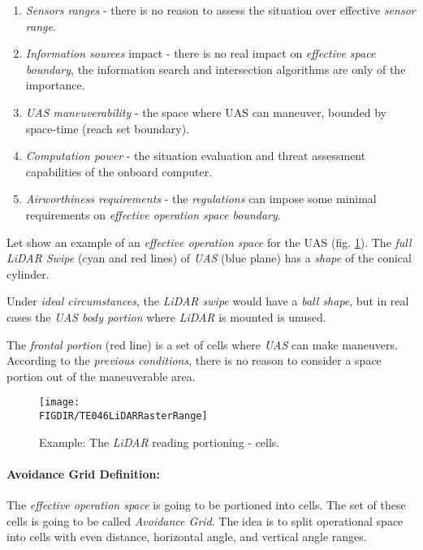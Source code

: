 \begin{enumerate}
        \item \emph{Sensors ranges} -  there is no reason to assess the situation over effective \emph{sensor range}.
        
        \item \emph{Information sources} impact - there is no real impact on \emph{effective space boundary}, the information search and intersection algorithms are only of the importance.
        
        \item \emph{UAS maneuverability} - the space where UAS can maneuver, bounded by space-time (reach set boundary). 
        
        \item \emph{Computation power} - the situation evaluation and threat assessment capabilities of the onboard computer.
        
        \item \emph{Airworthiness requirements} - the \emph{regulations} can impose some minimal requirements on \emph{effective operation space boundary}.
\end{enumerate}

Let show an example of an \emph{effective operation space} for the UAS  (fig. \ref{fig:LidarSpaceSegmentation}).  The \emph{full LiDAR Swipe} (cyan and red lines) of \emph{UAS} (blue plane) has a \emph{shape} of the conical cylinder. 

\begin{note}
Under \emph{ideal circumstances}, the \emph{LiDAR swipe} would have a \emph{ball shape}, but in real cases the \emph{UAS body portion} where \emph{LiDAR} is mounted is unused.
\end{note}

The \emph{frontal portion} (red line) is a set of cells where \emph{UAS} can make maneuvers. According to the \emph{previous conditions}, there is no reason to consider a  space portion out of the maneuverable area. 

\begin{figure}[H]
    \centering
    \texttt{[image: \\FIGDIR/TE046LiDARRasterRange]} 
    \caption{Example: The \emph{LiDAR} reading portioning - cells.}
    \label{fig:LidarSpaceSegmentation}
\end{figure}

\paragraph{Avoidance Grid Definition:} The \emph{effective operation space} is going to be portioned into cells. The set of these cells is going to be called \emph{Avoidance Grid}. The idea is to split operational space into cells with even distance, horizontal angle, and vertical angle ranges. 

